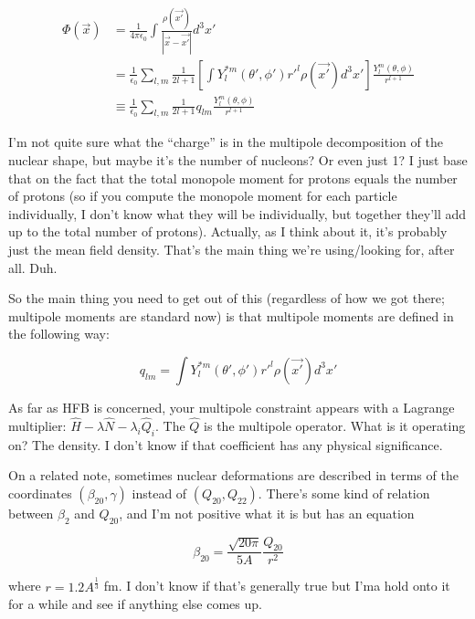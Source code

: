 \begin{align*}
\Phi(\vec{x}) &= \frac{1}{4\pi\epsilon_0}\int\frac{\rho(\vec{x'})}{|\vec{x}-\vec{x'}|}d^3x' \\
&= \frac{1}{\epsilon_0}\sum_{l,m}\frac{1}{2l+1}\left[\int Y_l^{*m}(\theta',\phi')r'^l\rho(\vec{x'})d^3x'\right]\frac{Y_l^m(\theta,\phi)}{r^{l+1}} \\
&\equiv \frac{1}{\epsilon_0}\sum_{l,m}\frac{1}{2l+1}q_{lm}\frac{Y_l^m(\theta,\phi)}{r^{l+1}}
\end{align*}

\noindent I'm not quite sure what the ``charge'' is in the multipole decomposition of the nuclear shape, but maybe it's the number of nucleons? Or even just 1? I just base that on the fact that the total monopole moment for protons equals the number of protons (so if you compute the monopole moment for each particle individually, I don't know what they will be individually, but together they'll add up to the total number of protons). Actually, as I think about it, it's probably just the mean field density. That's the main thing we're using/looking for, after all. Duh.

So the main thing you need to get out of this (regardless of how we got there; multipole moments are standard now) is that multipole moments are defined in the following way:

\begin{equation*}
q_{lm} = \int Y_l^{*m}(\theta',\phi')r'^l\rho(\vec{x'})d^3x'
\end{equation*}

As far as HFB is concerned, your multipole constraint appears with a Lagrange multiplier: $\hat{H} - \lambda\hat{N} - \lambda_i \hat{Q}_i$. The $\hat{Q}$ is the multipole operator. What is it operating on? The density. I don't know if that coefficient has any physical significance.

On a related note, sometimes nuclear deformations are described in terms of the coordinates $(\beta_{20}, \gamma)$ instead of $(Q_{20},Q_{22})$. There's some kind of relation between $\beta_2$ and $Q_{20}$, and I'm not positive what it is but \cite{Giuliani2017} has an equation

\begin{equation*}
\beta_{20} = \frac{\sqrt{20\pi}}{5A}\frac{Q_{20}}{r^2}
\end{equation*}

\noindent where $r=1.2A^\frac{1}{3}$ fm. I don't know if that's generally true but I'ma hold onto it for a while and see if anything else comes up.

